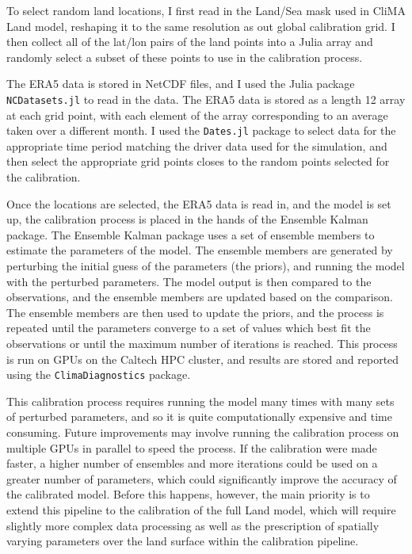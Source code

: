 \documentclass[11pt, a4paper]{article}
\begin{document}
To select random land locations, I first read in the Land/Sea mask used in CliMA
Land model, reshaping it to the same resolution as out global calibration grid.
I then collect all of the lat/lon pairs of the land points into a Julia array 
and randomly select a subset of these points to use in the calibration process.

The ERA5 data is stored in NetCDF files, and I used the Julia package
\texttt{NCDatasets.jl} to read in the data. The ERA5 data is stored as a length
12 array at each grid point, with each element of the array corresponding to an
average taken over a different month. I used the \texttt{Dates.jl} package to
select data for the appropriate time period matching the driver data used for
the simulation, and then select the appropriate grid points closes to the
random points selected for the calibration.

Once the locations are selected, the ERA5 data is read in, and the model is set
up, the calibration process is placed in the hands of the Ensemble Kalman
package. The Ensemble Kalman package uses a set of ensemble members to estimate
the parameters of the model. The ensemble members are generated by perturbing
the initial guess of the parameters (the priors), and running the model with the
perturbed parameters. The model output is then compared to the observations, and
the ensemble members are updated based on the comparison. The ensemble members
are then used to update the priors, and the process is repeated until the
parameters converge to a set of values which best fit the observations or until
the maximum number of iterations is reached. This process is run on GPUs on the
Caltech HPC cluster, and results are stored and reported using the
\texttt{ClimaDiagnostics} package.

This calibration process requires running the model many times with many sets of
perturbed parameters, and so it is quite computationally expensive and time 
consuming. Future improvements may involve running the calibration process on
multiple GPUs in parallel to speed the process. If the calibration were made 
faster, a higher number of ensembles and more iterations could be used on a
greater number of parameters, which could significantly improve the accuracy of
the calibrated model. Before this happens, however, the main priority is to 
extend this pipeline to the calibration of the full Land model, which will
require slightly more complex data processing as well as the prescription of 
spatially varying parameters over the land surface within the calibration
pipeline.
\end{document}
